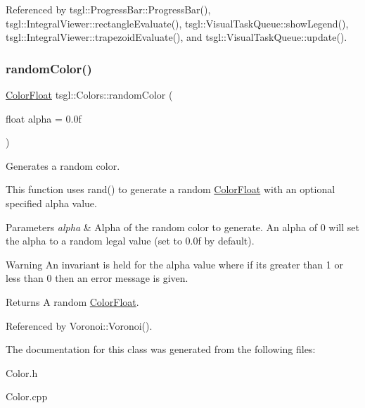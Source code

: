 Referenced by tsgl\+::\+Progress\+Bar\+::\+Progress\+Bar(), tsgl\+::\+Integral\+Viewer\+::rectangle\+Evaluate(), tsgl\+::\+Visual\+Task\+Queue\+::show\+Legend(), tsgl\+::\+Integral\+Viewer\+::trapezoid\+Evaluate(), and tsgl\+::\+Visual\+Task\+Queue\+::update().

\mbox{\label{classtsgl_1_1_colors_a0f28a13af4a0fc352a250c23ecc97e4f}} 
\subsubsection{\texorpdfstring{random\+Color()}{randomColor()}}
{\footnotesize\ttfamily \hyperlink{structtsgl_1_1_color_float}{Color\+Float} tsgl\+::\+Colors\+::random\+Color (\begin{DoxyParamCaption}\item[{float}]{alpha = {\ttfamily 0.0f} }\end{DoxyParamCaption})\hspace{0.3cm}{\ttfamily [static]}}



Generates a random color. 

This function uses rand() to generate a random \hyperlink{structtsgl_1_1_color_float}{Color\+Float} with an optional specified alpha value. 
\begin{DoxyParams}{Parameters}
{\em alpha} & Alpha of the random color to generate. An alpha of 0 will set the alpha to a random legal value (set to 0.\+0f by default). \\
\hline
\end{DoxyParams}
\begin{DoxyWarning}{Warning}
An invariant is held for the alpha value where if its greater than 1 or less than 0 then an error message is given. 
\end{DoxyWarning}
\begin{DoxyReturn}{Returns}
A random \hyperlink{structtsgl_1_1_color_float}{Color\+Float}. 
\end{DoxyReturn}


Referenced by Voronoi\+::\+Voronoi().



The documentation for this class was generated from the following files\+:\begin{DoxyCompactItemize}
\item 
Color.\+h\item 
Color.\+cpp\end{DoxyCompactItemize}
